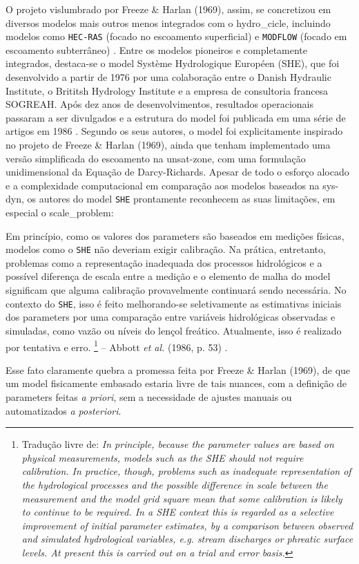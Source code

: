\documentclass[./main.tex]{subfiles}
\begin{document}
\par O projeto vislumbrado por Freeze \& Harlan (1969), assim, se concretizou em diversos modelos mais outros menos integrados com o \gls{hydro_cicle}, incluindo modelos como \texttt{HEC-RAS} (focado no escoamento superficial) e \texttt{MODFLOW} (focado em escoamento subterrâneo) \cite{Simmons2020a}. Entre os modelos pioneiros e completamente integrados, destaca-se o \gls{model} Système Hydrologique Européen (SHE), que foi desenvolvido a partir de 1976 por uma colaboração entre o Danish Hydraulic Institute, o Brititsh Hydrology Institute e a empresa de consultoria francesa SOGREAH. Após dez anos de desenvolvimentos, resultados operacionais passaram a ser divulgados e a estrutura do \gls{model} foi publicada em uma série de artigos em 1986 \cite{Abbott1986a, Abbott1986b}. Segundo os seus autores, o \gls{model} foi explicitamente inspirado no projeto de Freeze \& Harlan (1969), ainda que tenham implementado uma versão simplificada do escoamento na \gls{unsat-zone}, com uma formulação unidimensional da Equação de Darcy-Richards. Apesar de todo o esforço alocado e a complexidade computacional em comparação aos modelos baseados na \gls{sys-dyn}, os autores do \gls{model} \texttt{SHE} prontamente reconhecem as suas limitações, em especial o \gls{scale_problem}:
\begin{adjustwidth}{100pt}{0pt}
\medskip
\small
Em princípio, como os valores dos \gls{parameters} são baseados em medições físicas, modelos como o \texttt{SHE} não deveriam exigir calibração. Na prática, entretanto, problemas como a representação inadequada dos processos hidrológicos e a possível diferença de escala entre a medição e o elemento de malha do \gls{model} significam que alguma calibração provavelmente continuará sendo necessária. No contexto do \texttt{SHE}, isso é feito melhorando-se seletivamente as estimativas iniciais dos \gls{parameters} por uma comparação entre variáveis hidrológicas observadas e simuladas, como vazão ou níveis do lençol freático. Atualmente, isso é realizado por tentativa e erro.
\footnote{Tradução livre de: 
\textit{
In principle, because the parameter values are based on physical measurements, models such as the SHE should not require calibration. In practice, though, problems such as inadequate representation of the hydrological processes and the possible difference in scale between the measurement and the model grid square mean that some calibration is likely to continue to be required. In a SHE context this is regarded as a selective improvement of initial parameter estimates, by a comparison between observed and simulated hydrological variables, e.g. stream discharges or phreatic surface levels. At present this is carried out on a trial and error basis. 
}} -- Abbott \textit{et al.} (1986, p. 53) \cite{Abbott1986a}.
\medskip
\end{adjustwidth}
\noindent Esse fato claramente quebra a promessa feita por Freeze \& Harlan (1969), de que um \gls{model} fisicamente embasado estaria livre de tais nuances, com a definição de \gls{parameters} feitas \textit{a priori}, sem a necessidade de ajustes manuais ou automatizados \textit{a posteriori}. 
\end{document}
